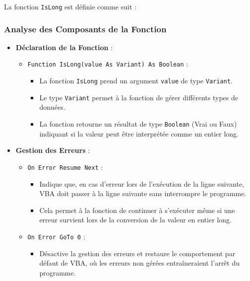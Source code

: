 \documentclass[a4paper, oneside, 12pt, final]{extreport}
\begin{document}
La fonction \texttt{IsLong} est définie comme suit :

\subsubsection{Analyse des Composants de la Fonction}

\begin{itemize}
    \item \textbf{Déclaration de la Fonction} :
    \begin{itemize}
        \item \texttt{Function IsLong(value As Variant) As Boolean} : 
        \begin{itemize}
            \item La fonction \texttt{IsLong} prend un argument \texttt{value} de type \texttt{Variant}. 
            \item Le type \texttt{Variant} permet à la fonction de gérer différents types de données. 
            \item La fonction retourne un résultat de type \texttt{Boolean} (Vrai ou Faux) indiquant si la valeur peut être interprétée comme un entier long.
        \end{itemize}
    \end{itemize}

    \item \textbf{Gestion des Erreurs} :
    \begin{itemize}
        \item \texttt{On Error Resume Next} : 
        \begin{itemize}
            \item Indique que, en cas d'erreur lors de l'exécution de la ligne suivante, VBA doit passer à la ligne suivante sans interrompre le programme. 
            \item Cela permet à la fonction de continuer à s'exécuter même si une erreur survient lors de la conversion de la valeur en entier long.
        \end{itemize}
        \item \texttt{On Error GoTo 0} : 
        \begin{itemize}
            \item Désactive la gestion des erreurs et restaure le comportement par défaut de VBA, où les erreurs non gérées entraîneraient l'arrêt du programme.
        \end{itemize}
    \end{itemize}


\end{itemize}
\end{document}

